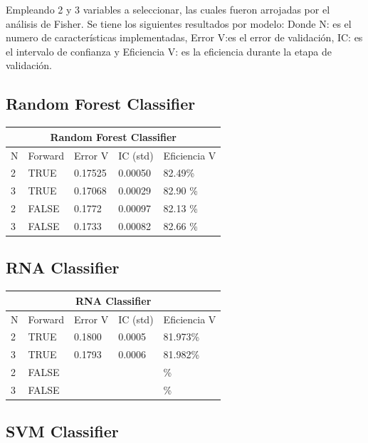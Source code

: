 \documentclass[conference]{IEEEtran}
\begin{document}
\newline
Empleando 2 y 3 variables a seleccionar, las cuales fueron arrojadas por el análisis de Fisher. Se tiene los siguientes resultados por modelo:
Donde N: es el numero de características implementadas, Error V:es el error de validación, IC: es el intervalo de confianza y Eficiencia V: es la eficiencia durante la etapa de validación.

\subsection{Random Forest Classifier}\hfill
\begin{table}[H]
\centering
\begin{tabular}{lllll}
\hline
\multicolumn{5}{c}{\textbf{Random Forest Classifier}} \\ \hline
N & Forward & Error V & IC (std) & Eficiencia V \\ \hline
2 & TRUE & 0.17525 & 0.00050  &82.49\% \\
3 & TRUE & 0.17068 & 0.00029  &82.90 \% \\
2 & FALSE & 0.1772 & 0.00097 & 82.13 \% \\
3 & FALSE & 0.1733  & 0.00082 & 82.66 \% \\ \hline
\end{tabular}
\end{table}

\subsection{RNA Classifier}\hfill

\begin{table}[h]
\centering
\begin{tabular}{lllll}
\hline
\multicolumn{5}{c}{\textbf{RNA Classifier}} \\ \hline
N & Forward & Error V & IC (std) & Eficiencia V \\ \hline
2 & TRUE & 0.1800  & 0.0005  & 81.973\% \\
3 & TRUE & 0.1793 &  0.0006 & 81.982\% \\
2 & FALSE & &  & \% \\
3 & FALSE &  & & \% \\ \hline
\end{tabular}
\end{table}

\subsection{SVM Classifier}\hfill
\end{document}
